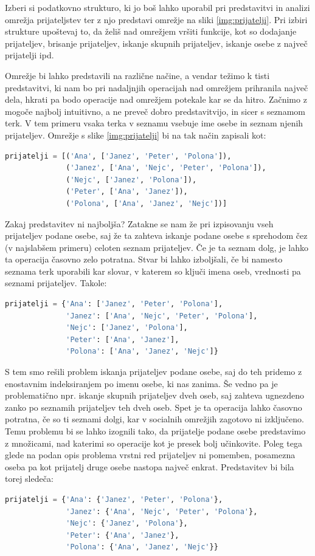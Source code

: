 \begin{zgled}
Izberi si podatkovno strukturo, ki jo boš lahko uporabil pri predstavitvi in analizi omrežja prijateljstev ter z njo predstavi omrežje na sliki \ref{img:prijatelji}. Pri izbiri strukture upoštevaj to, da želiš nad omrežjem vršiti funkcije, kot so dodajanje prijateljev, brisanje prijateljev, iskanje skupnih prijateljev, iskanje osebe z največ prijatelji ipd.
\end{zgled}
\begin{resitev}
Omrežje bi lahko predstavili na različne načine, a vendar težimo k tisti predstavitvi, ki nam bo pri nadaljnjih operacijah nad omrežjem prihranila največ dela, hkrati pa bodo operacije nad omrežjem potekale kar se da hitro. Začnimo z mogoče najbolj intuitivno, a ne preveč dobro predstavitvijo, in sicer s seznamom terk. V tem primeru vsaka terka v seznamu vsebuje ime osebe in seznam njenih prijateljev. Omrežje s slike \ref{img:prijatelji} bi na tak način zapisali kot:
\begin{lstlisting}[language=Python]
prijatelji = [('Ana', ['Janez', 'Peter', 'Polona']),
              ('Janez', ['Ana', 'Nejc', 'Peter', 'Polona']),
              ('Nejc', ['Janez', 'Polona']),
              ('Peter', ['Ana', 'Janez']),
              ('Polona', ['Ana', 'Janez', 'Nejc'])]
\end{lstlisting}
Zakaj predstavitev ni najboljša? Zatakne se nam že pri izpisovanju vseh prijateljev podane osebe, saj že ta zahteva iskanje podane osebe s sprehodom čez (v najslabšem primeru) celoten seznam prijateljev. Če je ta seznam dolg, je lahko ta operacija časovno zelo potratna. Stvar bi lahko izboljšali, če bi namesto seznama terk uporabili kar slovar, v katerem so ključi imena oseb, vrednosti pa seznami prijateljev. Takole: 
\begin{lstlisting}[language=Python]
prijatelji = {'Ana': ['Janez', 'Peter', 'Polona'],
              'Janez': ['Ana', 'Nejc', 'Peter', 'Polona'],
              'Nejc': ['Janez', 'Polona'],
              'Peter': ['Ana', 'Janez'],
              'Polona': ['Ana', 'Janez', 'Nejc']}
\end{lstlisting}
S tem smo rešili problem iskanja prijateljev podane osebe, saj do teh pridemo z enostavnim indeksiranjem po imenu osebe, ki nas zanima. Še vedno pa je problematično npr. iskanje skupnih prijateljev dveh oseb, saj zahteva ugnezdeno zanko po seznamih prijateljev teh dveh oseb. Spet je ta operacija lahko časovno potratna, če so ti seznami dolgi, kar v socialnih omrežjih zagotovo ni izključeno. Temu problemu bi se lahko izognili tako, da prijatelje podane osebe predstavimo z množicami, nad katerimi so operacije kot je presek bolj učinkovite. Poleg tega glede na podan opis problema vrstni red prijateljev ni pomemben, posamezna oseba pa kot prijatelj druge osebe nastopa največ enkrat. Predstavitev bi bila torej sledeča:
\begin{lstlisting}[language=Python]
prijatelji = {'Ana': {'Janez', 'Peter', 'Polona'},
              'Janez': {'Ana', 'Nejc', 'Peter', 'Polona'},
              'Nejc': {'Janez', 'Polona'},
              'Peter': {'Ana', 'Janez'},
              'Polona': {'Ana', 'Janez', 'Nejc'}}
\end{lstlisting}
\end{resitev}

